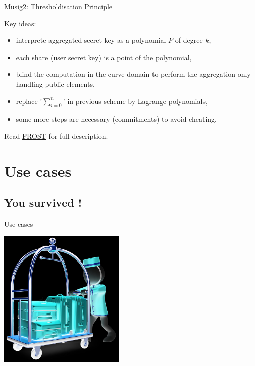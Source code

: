\documentclass[aspectratio=43]{beamer}
\begin{document}
\begin{frame}{Musig2: Thresholdisation Principle}
{}
{
Key ideas:
\begin{itemize}
\item interprete aggregated secret key as a polynomial $P$ of degree $k$,
\item each share (user secret key) is a point of the polynomial,
\item blind the computation in the curve domain to perform the aggregation only handling public elements,
\item replace '$\sum_{i=0}^n$' in previous scheme by Lagrange polynomials,
\item some more steps are necessary (commitments) to avoid cheating.
\end{itemize}

Read \href{https://eprint.iacr.org/2020/852.pdf}{{\cyan FROST}} for full description.

}



\end{frame}  



 \section{Use cases}
 
\subsection{You survived !}
 
 
 
\begin{frame}{Use cases}


\begin{center}
\includegraphics[width=6cm]{images/usecases.jpg}
\end{center}           

\end{frame}
\end{document}
